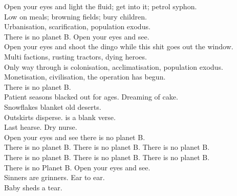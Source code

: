 
\label{album:infest-the-rats-nest}




Open your eyes and light the fluid; get into it; petrol syphon. \\
Low on meals; browning fields; bury children. \\
Urbanisation, scarification, population exodus. \\
There is no planet B. Open your eyes and see. \\

Open your eyes and shoot the dingo while this shit goes out the window. \\
Multi factions, rusting tractors, dying heroes. \\

Only way through is colonisation, acclimatisation, population exodus. \\
Monetisation, civilisation, the operation has begun. \\
There is no planet B. \\

Patient seasons blacked out for ages. Dreaming of cake. \\
Snowflakes blanket old deserts. \\
Outskirts disperse.  is a blank verse. \\
Last hearse. Dry nurse. \\

Open your eyes and see there is no planet B. \\
There is no planet B. There is no planet B. There is no planet B. \\
There is no planet B. There is no planet B. There is no planet B. \\
There is no Planet B. Open your eyes and see. \\

Sinners are grinners. Ear to ear. \\
Baby  sheds a tear. \\



